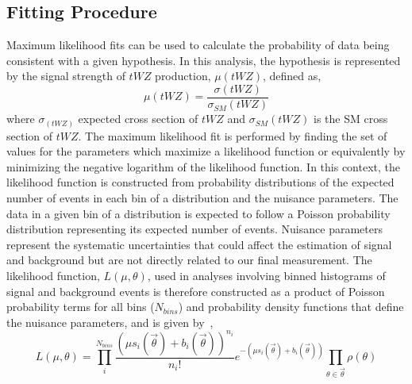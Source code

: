 \subsection{Fitting Procedure}
\label{sec:fitting-procedure}
Maximum likelihood fits can be used to calculate the probability of data being consistent with a given hypothesis. In this analysis, the hypothesis is represented by the signal strength of $tWZ$ production, $\mu (tWZ)$, defined as,
\begin{equation}
\mu (tWZ) = \frac{\sigma(tWZ)}{\sigma_{SM}(tWZ)}
\end{equation}
where $\sigma_{(tWZ)}$ expected cross section of $tWZ$ and $\sigma_{SM}(tWZ)$ is the SM cross section of $tWZ$. The maximum likelihood fit is performed by finding the set of values for the parameters which maximize a likelihood function or equivalently by minimizing the negative logarithm of the likelihood function. In this context, the likelihood function is constructed from probability distributions of the expected number of events in each bin of a distribution and the nuisance parameters. The data in a given bin of a distribution is expected to follow a Poisson probability distribution representing its expected number of events. Nuisance parameters represent the systematic uncertainties that could affect the estimation of signal and background but are not directly related to our final measurement. The likelihood function, $L(\mu,\theta)$, used in analyses involving binned histograms of signal and background events is therefore constructed as a product of Poisson probability terms for all bins ($N_{bins}$) and probability density functions that define the nuisance parameters, and is given by~\cite{BARLOW1993219},
\begin{equation}
L(\mu, \theta) = \prod_{i}^{N_{bins}} \frac{(\mu s_{i}(\vec{\theta}) + b_{i} (\vec{\theta}))^{n_{i}}}{n_{i}!} e^{-(\mu s_{i}(\vec{\theta}) + b_{i} (\vec{\theta}))} \prod_{\theta \in \vec{\theta}} \rho (\theta) 
\end{equation}
